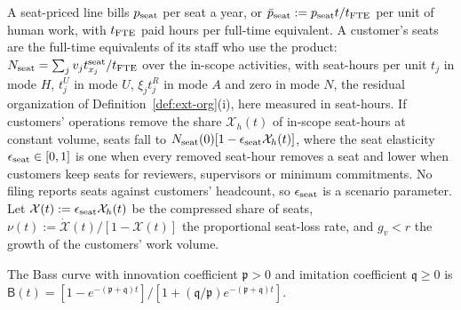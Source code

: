 \begin{assumption}[Seats]\label{ass:prod-seats}
A seat-priced line bills $p_{\rm seat}$ per seat a year, or $\bar p_{\rm seat}:=p_{\rm seat}t/t_{\rm FTE}$ per unit of human work, with $t_{\rm FTE}$ paid hours per full-time equivalent. A customer's seats are the full-time equivalents of its staff who use the product: $N_{\rm seat}=\sum_jv_jt^{\rm seat}_{x_j}/t_{\rm FTE}$ over the in-scope activities, with seat-hours per unit $t_j$ in mode $H$, $t^U_j$ in mode $U$, $\xi_jt^R_j$ in mode $A$ and zero in mode $N$, the residual organization of Definition~\ref{def:ext-org}(i), here measured in seat-hours. If customers' operations remove the share $\mathcal X_h(t)$ of in-scope seat-hours at constant volume, seats fall to $N_{\rm seat}(0)[1-\epsilon_{\rm seat}\mathcal X_h(t)]$, where the seat elasticity $\epsilon_{\rm seat}\in[0,1]$ is one when every removed seat-hour removes a seat and lower when customers keep seats for reviewers, supervisors or minimum commitments. No filing reports seats against customers' headcount, so $\epsilon_{\rm seat}$ is a scenario parameter. Let $\mathcal X(t):=\epsilon_{\rm seat}\mathcal X_h(t)$ be the compressed share of seats, $\nu(t):=\dot{\mathcal X}(t)/[1-\mathcal X(t)]$ the proportional seat-loss rate, and $g_v<r$ the growth of the customers' work volume.
\end{assumption}

The Bass curve with innovation coefficient $\mathfrak p>0$ and imitation coefficient $\mathfrak q\ge 0$ \citep{bass1969new} is $\mathsf B(t)=[1-e^{-(\mathfrak p+\mathfrak q)t}]/[1+(\mathfrak q/\mathfrak p)e^{-(\mathfrak p+\mathfrak q)t}]$.

